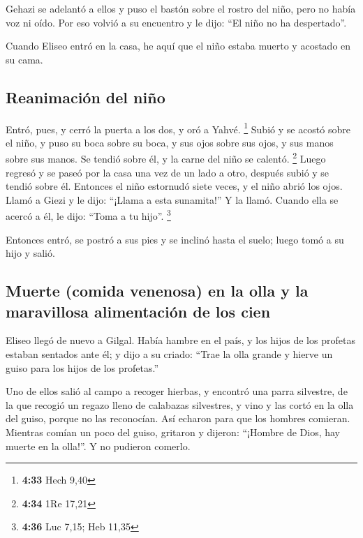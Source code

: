  Gehazi se adelantó a ellos y puso el bastón sobre el
rostro del niño, pero no había voz ni oído. Por eso volvió a su
encuentro y le dijo: ``El niño no ha despertado''.

 Cuando Eliseo entró en la casa, he aquí que el niño
estaba muerto y acostado en su cama.

\hypertarget{reanimaciuxf3n-del-niuxf1o}{%
\subsection{Reanimación del niño}\label{reanimaciuxf3n-del-niuxf1o}}

 Entró, pues, y cerró la puerta a los dos, y oró a Yahvé.
\footnote{\textbf{4:33} Hech 9,40}  Subió y se acostó
sobre el niño, y puso su boca sobre su boca, y sus ojos sobre sus ojos,
y sus manos sobre sus manos. Se tendió sobre él, y la carne del niño se
calentó. \footnote{\textbf{4:34} 1Re 17,21}  Luego
regresó y se paseó por la casa una vez de un lado a otro, después subió
y se tendió sobre él. Entonces el niño estornudó siete veces, y el niño
abrió los ojos.  Llamó a Giezi y le dijo: ``¡Llama a esta
sunamita!'' Y la llamó. Cuando ella se acercó a él, le dijo: ``Toma a tu
hijo''. \footnote{\textbf{4:36} Luc 7,15; Heb 11,35}

 Entonces entró, se postró a sus pies y se inclinó hasta
el suelo; luego tomó a su hijo y salió.

\hypertarget{muerte-comida-venenosa-en-la-olla-y-la-maravillosa-alimentaciuxf3n-de-los-cien}{%
\subsection{Muerte (comida venenosa) en la olla y la maravillosa
alimentación de los
cien}\label{muerte-comida-venenosa-en-la-olla-y-la-maravillosa-alimentaciuxf3n-de-los-cien}}

 Eliseo llegó de nuevo a Gilgal. Había hambre en el país,
y los hijos de los profetas estaban sentados ante él; y dijo a su
criado: ``Trae la olla grande y hierve un guiso para los hijos de los
profetas.''

 Uno de ellos salió al campo a recoger hierbas, y
encontró una parra silvestre, de la que recogió un regazo lleno de
calabazas silvestres, y vino y las cortó en la olla del guiso, porque no
las reconocían.  Así echaron para que los hombres
comieran. Mientras comían un poco del guiso, gritaron y dijeron:
``¡Hombre de Dios, hay muerte en la olla!''. Y no pudieron comerlo.

